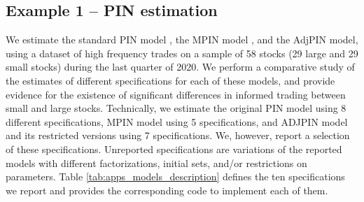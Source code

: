 \subsection{Example 1 – PIN estimation}

We estimate the standard PIN model \citep{easley1996liquidity}, the MPIN model \citep{ersan2016multilayer}, and the AdjPIN model,  \citep{duarte2009why} using a dataset of high frequency trades on a sample of 58 stocks (29 large and 29 small stocks) during the last quarter of 2020. We perform a comparative study of the estimates of different specifications for each of these models, and provide evidence for the existence of significant differences in informed trading between small and large stocks. Technically, we estimate the original PIN model using 8 different specifications, MPIN model using 5 specifications, and ADJPIN model and its restricted versions using 7 specifications. We, however, report a selection of these specifications. Unreported specifications are variations of the reported models with different factorizations,  initial sets, and/or restrictions on parameters. Table \ref{tab:apps_models_description} defines the ten specifications we report and provides the corresponding code to implement each of them.



